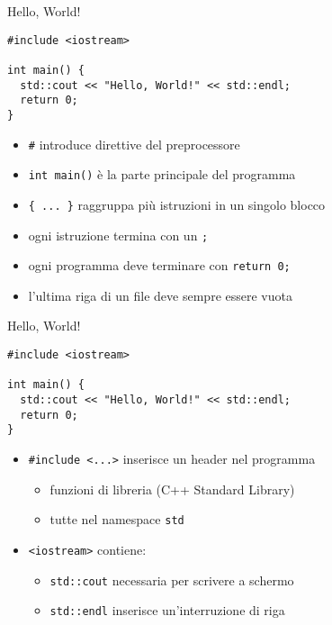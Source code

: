 \begin{frame}[fragile]{Hello, World!}
  \vfill
  \begin{lstlisting}
#include <iostream>

int main() {
  std::cout << "Hello, World!" << std::endl;
  return 0;
}
  \end{lstlisting}
  \vfill
  \begin{itemize}
    \item \lstinline$#$ introduce direttive del preprocessore
    \vfill
    \item \lstinline$int main()$ è la parte principale del programma
    \vfill
    \item \lstinline${ ... }$ raggruppa più istruzioni in un singolo blocco
    \vfill
    \item ogni istruzione termina con un \lstinline$;$
    \vfill
    \item ogni programma deve terminare con \lstinline$return 0;$
    \vfill
    \item l'ultima riga di un file deve sempre essere vuota
  \end{itemize}
  \vfill
\end{frame}

\begin{frame}[fragile]{Hello, World!}
  \vfill
  \begin{lstlisting}
#include <iostream>

int main() {
  std::cout << "Hello, World!" << std::endl;
  return 0;
}
  \end{lstlisting}
  \vfill
  \begin{itemize}
    \item \lstinline$#include <...>$ inserisce un \alert{header} nel programma
    \begin{itemize}
      \item funzioni di libreria (C++ Standard Library)
      \item tutte nel \alert{namespace} \lstinline$std$
    \end{itemize}
    \vfill
    \item \lstinline$<iostream>$ contiene:
    \begin{itemize}
      \item \lstinline$std::cout$ necessaria per scrivere a schermo
      \item \lstinline$std::endl$ inserisce un'interruzione di riga
    \end{itemize}
  \end{itemize}
  \vfill
\end{frame}

